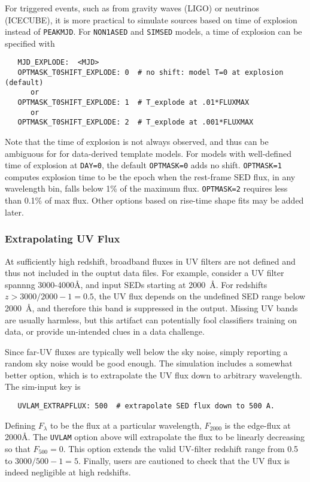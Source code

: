 \documentclass[12pt]{article}
\begin{document}
For triggered events, 
such as from gravity waves (LIGO) or neutrinos (ICECUBE),
it is more practical to simulate sources based on time
of explosion instead of {\tt PEAKMJD}. 
For {\tt NON1ASED} and {\tt SIMSED} models,
a time of explosion can be specified with
\begin{verbatim}
   MJD_EXPLODE:  <MJD>
   OPTMASK_T0SHIFT_EXPLODE: 0  # no shift: model T=0 at explosion (default)
      or
   OPTMASK_T0SHIFT_EXPLODE: 1  # T_explode at .01*FLUXMAX 
      or
   OPTMASK_T0SHIFT_EXPLODE: 2  # T_explode at .001*FLUXMAX
\end{verbatim}
%
Note that the time of explosion is not always observed, 
and thus can be ambiguous for for data-derived template models. 
For models with well-defined time of explosion at {\tt DAY=0},
the default {\tt OPTMASK=0} adds no shift.
{\tt OPTMASK=1} computes explosion time to be the epoch when 
the rest-frame SED flux, in any wavelength bin,  
falls below 1\% of the maximum flux.
{\tt OPTMASK=2} requires less than 0.1\% of max flux.
Other options based on rise-time shape fits may be added later.

\subsubsection{Extrapolating UV Flux}
\label{sss:UVLAM_EXTRAP}

At sufficiently high redshift, broadband fluxes in UV filters 
are not defined and thus not included in the ouptut data files.
For example, consider a UV filter spannng 3000-4000\AA,
and input SEDs starting at 2000~\AA. 
For redshifts $z> 3000/2000-1 = 0.5$, the UV flux depends
on the undefined SED range  below 2000~\AA, and therefore
this band is suppressed in the output. Missing UV bands are
usually harmless, but this artifact can potentially fool
classifiers training on data, or provide un-intended clues
in a data challenge.  

Since far-UV fluxes are typically well below the sky noise,
simply reporting a random sky noise would be good enough.
The simulation includes a somewhat better option,
which is to extrapolate the UV flux down to arbitrary
wavelength. The sim-input key is
\begin{verbatim}
   UVLAM_EXTRAPFLUX: 500  # extrapolate SED flux down to 500 A.
\end{verbatim}
%
\newcommand{\FLUXLAM}{F_{\lambda}}
\newcommand{\FLUXedge}{F_{2000}}
\newcommand{\FLUXEXTRAP}{F_{500}}
%
Defining $\FLUXLAM$ to be the flux at a particular wavelength,
$\FLUXedge$ is the edge-flux at 2000\AA. The {\tt UVLAM} option 
above will extrapolate the flux
to be linearly decreasing so that $\FLUXEXTRAP=0$.
This option extends the valid UV-filter redshift range from 0.5 to
$3000/500-1 = 5$.
Finally, users are cautioned to check that the UV flux is indeed
negligible at high redshifts.
\end{document}

